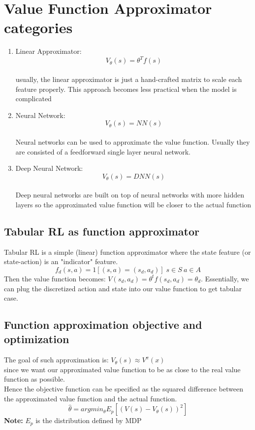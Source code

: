 \documentclass[11pt]{article}
\begin{document}
\section{Value Function Approximator categories}
\begin{enumerate}
    \item Linear Approximator: \\
    $$V_\theta(s) = \theta^T f(s)$$\\
    usually, the linear approximator is just a hand-crafted matrix to scale each feature properly. This approach becomes less practical when the model is complicated
    
    \item Neural Network:\\
        $$V_\theta(s) = NN(s)$$\\
        Neural networks can be used to approximate the value function. Usually they are consisted of a feedforward single layer neural network.
        
     \item Deep Neural Network:\\
        $$V_\theta(s) = DNN(s)$$\\
        Deep neural networks are built on top of neural networks with more hidden layers so the approximated value function will be closer to the actual function
    
\end{enumerate}


\subsection{Tabular RL as function approximator}

Tabular RL is a simple (linear) function approximator where the state feature (or state-action) is an "indicator" feature. \\
$$f_d (s,a) = 1 [(s,a)=(s_d,a_d)] \; s \in S \: a \in A  $$ 
Then the value function becomes: $V(s_d,a_d) = \theta^t f(s_d,a_d) = \theta_d$. Essentially, we can plug the discretized action and state into our value function to get tabular case.

\subsection{Function approximation objective and optimization}
The goal of such approximation is: 
$V_{\theta}(s) \approx V^{\pi}(x)$ \\ since we want our approximated value function to be as close to the real value function as possible. \\
Hence the objective function can be specified as the squared difference between the approximated value function and the actual function.\\
$$\hat{\theta} = argmin_{\theta} E_p [(V(s) - V_\theta (s))^2]$$
\textbf{Note:} $E_p$ is the distribution defined by MDP \\
\end{document}
